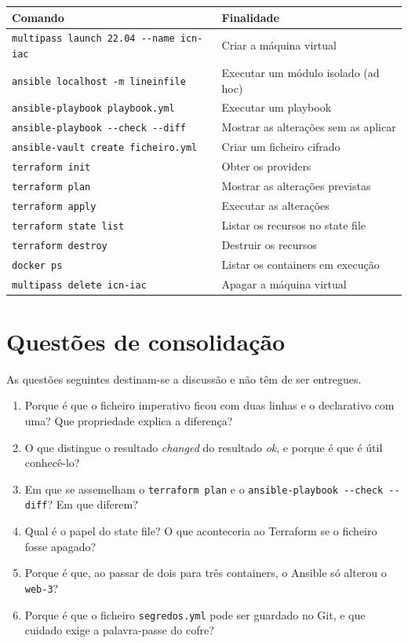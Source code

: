 \documentclass[11pt,a4paper]{article}
\newcommand{\cmd}[1]{\texttt{#1}}
\begin{document}
\begin{center}
\small
\begin{tabular}{>{\raggedright\arraybackslash}p{7cm} >{\raggedright\arraybackslash}p{7.8cm}}
\toprule
\textbf{Comando} & \textbf{Finalidade} \\
\midrule
\cmd{multipass launch 22.04 -{}-name icn-iac} & Criar a máquina virtual \\
\cmd{ansible localhost -m lineinfile} & Executar um módulo isolado (ad hoc) \\
\cmd{ansible-playbook playbook.yml} & Executar um playbook \\
\cmd{ansible-playbook -{}-check -{}-diff} & Mostrar as alterações sem as aplicar \\
\cmd{ansible-vault create ficheiro.yml} & Criar um ficheiro cifrado \\
\cmd{terraform init} & Obter os providers \\
\cmd{terraform plan} & Mostrar as alterações previstas \\
\cmd{terraform apply} & Executar as alterações \\
\cmd{terraform state list} & Listar os recursos no state file \\
\cmd{terraform destroy} & Destruir os recursos \\
\cmd{docker ps} & Listar os containers em execução \\
\cmd{multipass delete icn-iac} & Apagar a máquina virtual \\
\bottomrule
\end{tabular}
\end{center}

\section*{Questões de consolidação}

As questões seguintes destinam-se a discussão e não têm de ser entregues.

\begin{enumerate}
  \item Porque é que o ficheiro imperativo ficou com duas linhas e o declarativo com uma? Que propriedade explica a diferença?
  \item O que distingue o resultado \emph{changed} do resultado \emph{ok}, e porque é que é útil conhecê-lo?
  \item Em que se assemelham o \cmd{terraform plan} e o \cmd{ansible-playbook -{}-check -{}-diff}? Em que diferem?
  \item Qual é o papel do state file? O que aconteceria ao Terraform se o ficheiro fosse apagado?
  \item Porque é que, ao passar de dois para três containers, o Ansible só alterou o \cmd{web-3}?
  \item Porque é que o ficheiro \cmd{segredos.yml} pode ser guardado no Git, e que cuidado exige a palavra-passe do cofre?
\end{enumerate}
\end{document}
